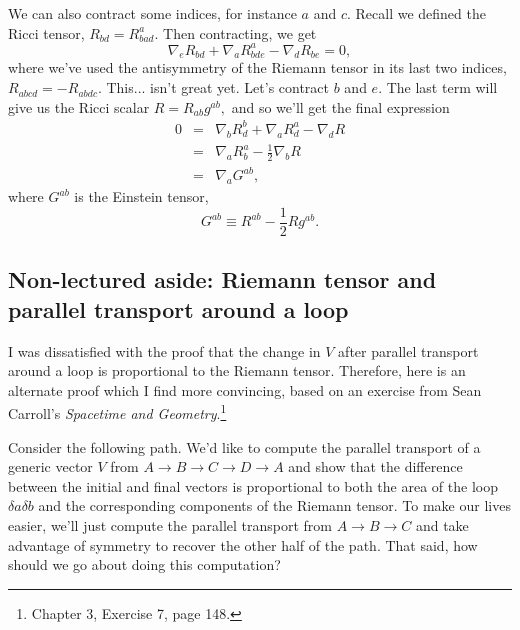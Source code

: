 We can also contract some indices, for instance $a$ and $c$. Recall we defined the Ricci tensor, $R_{bd}=R^a_{bad}$. Then contracting, we get
$$\nabla_e R_{bd}+\nabla_a R^a_{bde}-\nabla_d R_{be}=0,$$
where we've used the antisymmetry of the Riemann tensor in its last two indices, $R_{abcd}=-R_{abdc}.$ This... isn't great yet. Let's contract $b$ and $e$. The last term will give us the Ricci scalar $R=R_{ab}g^{ab},$ and so we'll get the final expression
\begin{eqnarray*}
0&=&\nabla_b R^b_d +\nabla_a R^a_d -\nabla_d R\\
&=&\nabla_a R^a_b -\frac{1}{2}\nabla_b R\\
&=& \nabla_a G^{ab},
\end{eqnarray*}
where $G^{ab}$ is the Einstein tensor,
$$G^{ab}\equiv R^{ab}-\frac{1}{2}Rg^{ab}.$$

\subsection*{Non-lectured aside: Riemann tensor and parallel transport around a loop}

I was dissatisfied with the proof that the change in $V$ after parallel transport around a loop is proportional to the Riemann tensor. Therefore, here is an alternate proof which I find more convincing, based on an exercise from Sean Carroll's \textit{Spacetime and Geometry}.\footnote{Chapter 3, Exercise 7, page 148.}

Consider the following path.%
We'd like to compute the parallel transport of a generic vector $V$ from $A\to B\to C \to D \to A$ and show that the difference between the initial and final vectors is proportional to both the area of the loop $\delta a \delta b$ and the corresponding components of the Riemann tensor. To make our lives easier, we'll just compute the parallel transport from $A\to B \to C$ and take advantage of symmetry to recover the other half of the path. That said, how should we go about doing this computation?

